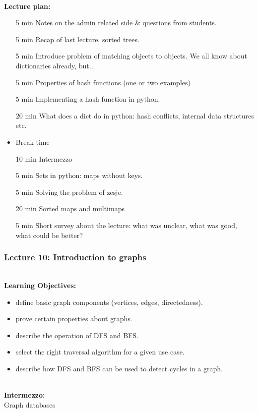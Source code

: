 \hfill\\
\textbf{Lecture plan:}\\
\begin{itemize}
	\item[5 min] Notes on the admin related side \& questions from students.
	\item[5 min] Recap of last lecture, sorted trees.
	\item[5 min] Introduce problem of matching objects to objects. We all know about dictionaries already, but...
	\item[5 min] Properties of hash functions (one or two examples)
	\item[5 min] Implementing a hash function in python.
	\item[20 min] What does a dict do in python: hash conflicts, internal data structures etc.
	\item Break time
	\item[10 min] Intermezzo
	\item[5 min] Sets in python: maps without keys.
	\item[5 min] Solving the problem of zesje.
	\item[20 min] Sorted maps and multimaps
	\item[5 min] Short survey about the lecture: what was unclear, what was good, what could be better?
\end{itemize}

\newpage
\subsubsection{Lecture 10: Introduction to graphs}
\label{sub:lecture_8}

\hfill\\
\textbf{Learning Objectives:}\\
\begin{itemize}
	\item define basic graph components (vertices, edges, directedness).
	\item prove certain properties about graphs.
	\item describe the operation of DFS and BFS.
	\item select the right traversal algorithm for a given use case.
	\item describe how DFS and BFS can be used to detect cycles in a graph.
\end{itemize}

\hfill\\
\textbf{Intermezzo:}\\
Graph databases

